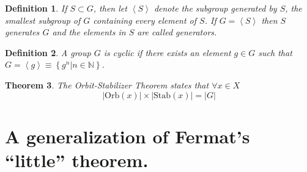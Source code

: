 \documentclass[english]{article}
\newtheorem{theorem}{Theorem}
\newtheorem{definition}[theorem]{Definition}
\begin{document}
\begin{definition}

If $S\subset G$, then let $\left\langle S\right\rangle $ denote
the subgroup generated by $S$, the smallest subgroup of $G$ containing
every element of $S$. If $G=\left\langle S\right\rangle $ then $S$
generates $G$ and the elements in $S$ are called \emph{generators}.

\end{definition}

\begin{definition}

A group $G$ is \emph{cyclic} if there exists an element $g\in G$
such that $G=\left\langle g\right\rangle \equiv\left\{ g^{n}|n\in\mathbb{N}\right\} $.

\end{definition}\begin{theorem}

The \emph{Orbit-Stabilizer} Theorem states that $\forall x\in X$\[
\left|\text{Orb}\left(x\right)\right|\times\left|\text{Stab}\left(x\right)\right|=\left|G\right|\]


\end{theorem}


\section{A generalization of Fermat's {}``little'' theorem.}
\end{document}
